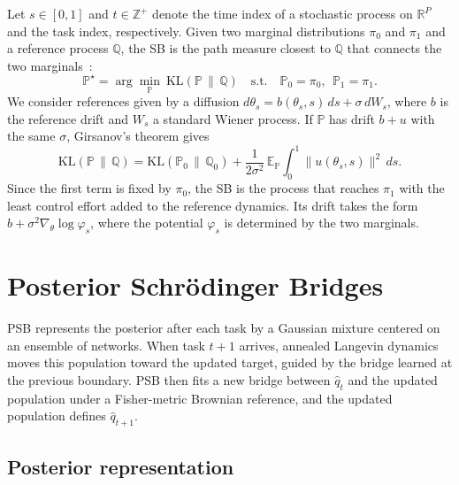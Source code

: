 Let $s\in[0,1]$ and $t\in\mathbb{Z}^+$ denote the time index of a stochastic process on $\mathbb{R}^P$ and the task index, respectively. Given two marginal distributions
$\pi_0$ and $\pi_1$ and a reference process $\mathbb{Q}$, the SB is the path measure closest to $\mathbb{Q}$ that connects the two
marginals~\cite{leonard2014survey}:
\begin{equation}
    \mathbb{P}^\star = \arg\min_{\mathbb{P}}\ \mathrm{KL}(\mathbb{P}\,\|\,\mathbb{Q})
    \quad \text{s.t.} \quad \mathbb{P}_0=\pi_0,\ \ \mathbb{P}_1=\pi_1 .
    \label{eq:sb}
\end{equation}
We consider references given by a diffusion
$d\theta_s = b(\theta_s,s)\,ds + \sigma\,dW_s$, where $b$ is the reference drift
and $W_s$ a standard Wiener process. If $\mathbb{P}$ has drift $b+u$ with the
same $\sigma$, Girsanov's theorem gives
\begin{equation}
    \mathrm{KL}(\mathbb{P}\,\|\,\mathbb{Q})
    = \mathrm{KL}(\mathbb{P}_0\,\|\,\mathbb{Q}_0)
    + \frac{1}{2\sigma^2}\,\mathbb{E}_{\mathbb{P}}\!\int_0^1 \|u(\theta_s,s)\|^2\,ds .
    \label{eq:girsanov}
\end{equation}
Since the first term is fixed by $\pi_0$, the SB is the process that reaches
$\pi_1$ with the least control effort added to the reference dynamics. Its drift
takes the form $b+\sigma^2\nabla_\theta\log\varphi_s$, where the potential
$\varphi_s$ is determined by the two marginals.

\section{Posterior Schr\"odinger Bridges}
\label{sec:method}

PSB represents the posterior after each task by a Gaussian mixture centered on
an ensemble of networks. When task $t+1$ arrives, annealed Langevin dynamics
moves this population toward the updated target, guided by the bridge learned at
the previous boundary. PSB then fits a new bridge between $\hat q_t$ and the
updated population under a Fisher-metric Brownian reference, and the updated
population defines $\hat q_{t+1}$.

\subsection{Posterior representation}
\label{sec:representation}

